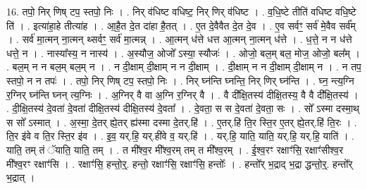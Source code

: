 \documentclass[17pt]{extarticle}
\begin{document}
16. तपो॒ निर् णिष् टप॒ स्तपो॒ निः । . निर् व॑धिष्ट वधिष्ट॒ निर् णिर् व॑धिष्ट । . व॒धि॒ष्टे तीति॑ वधिष्ट वधि॒ष्टे ति॑ । . इत्या॑हा॒हे तीत्या॑ह । . आ॒है॒त दे॒त दा॑हा है॒तत् । . ए॒त दे॒वैवैत दे॒त दे॒व । . ए॒व सर्वꣳ॒॒ सर्व॑ मे॒वैव सर्व᳚म् । . सर्व॑ मा॒त्मन् ना॒त्मन् थ्सर्वꣳ॒॒ सर्व॑ मा॒त्मन्न् । . आ॒त्मन् ध॑त्ते धत्त आ॒त्मन् ना॒त्मन् ध॑त्ते । . ध॒त्ते॒ न न ध॑त्ते धत्ते॒ न । . नास्या᳚स्य॒ न नास्य॑ । . अ॒स्यौज॒ ओजो᳚ ऽस्या॒ स्यौजः॑ । . ओजो॒ बल॒म् बल॒ मोज॒ ओजो॒ बल᳚म् । . बल॒म् न न बल॒म् बल॒म् न । . न दी॒क्षाम् दी॒क्षाम् न न दी॒क्षाम् । . दी॒क्षाम् न न दी॒क्षाम् दी॒क्षाम् न । . न तप॒ स्तपो॒ न न तपः॑ । . तपो॒ निर् णिष् टप॒ स्तपो॒ निः । . निर् घ्न॑न्ति घ्नन्ति॒ निर् णिर् घ्न॑न्ति । . घ्न॒ न्त्य॒ग्नि र॒ग्निर् घ्न॑न्ति घ्नन् त्य॒ग्निः । . अ॒ग्निर् वै वा अ॒ग्नि र॒ग्निर् वै । . वै दी᳚क्षि॒तस्य॑ दीक्षि॒तस्य॒ वै वै दी᳚क्षि॒तस्य॑ । . दी॒क्षि॒तस्य॑ दे॒वता॑ दे॒वता॑ दीक्षि॒तस्य॑ दीक्षि॒तस्य॑ दे॒वता᳚ । . दे॒वता॒ स स दे॒वता॑ दे॒वता॒ सः । . सो᳚ ऽस्मा दस्मा॒थ् स सो᳚ ऽस्मात् । . अ॒स्मा॒ दे॒तर् ह्ये॒तर् ह्य॑स्मा दस्मा दे॒तर्.हि॑ । . ए॒तर्.हि॑ ति॒र स्ति॒र ए॒तर् ह्ये॒तर्.हि॑ ति॒रः । . ति॒र इ॑वे व ति॒र स्ति॒र इ॑व । . इ॒व॒ यर्.हि॒ यर्.ही॑वे व॒ यर्.हि॑ । . यर्.हि॒ याति॒ याति॒ यर्.हि॒ यर्.हि॒ याति॑ । . याति॒ तम् तं ॅयाति॒ याति॒ तम् । . त मी᳚श्व॒र मी᳚श्व॒रम् तम् त मी᳚श्व॒रम् । . ई॒श्व॒रꣳ रक्षाꣳ॑सि॒ रक्षाꣳ॑सीश्व॒र मी᳚श्व॒रꣳ रक्षाꣳ॑सि । . रक्षाꣳ॑सि॒ हन्तो॒र्॒. हन्तो॒ रक्षाꣳ॑सि॒ रक्षाꣳ॑सि॒ हन्तोः᳚ । . हन्तो᳚र् भ॒द्राद् भ॒द्रा द्धन्तो॒र्॒. हन्तो᳚र् भ॒द्रात् । \newline
\pagebreak
{}
\end{document}
